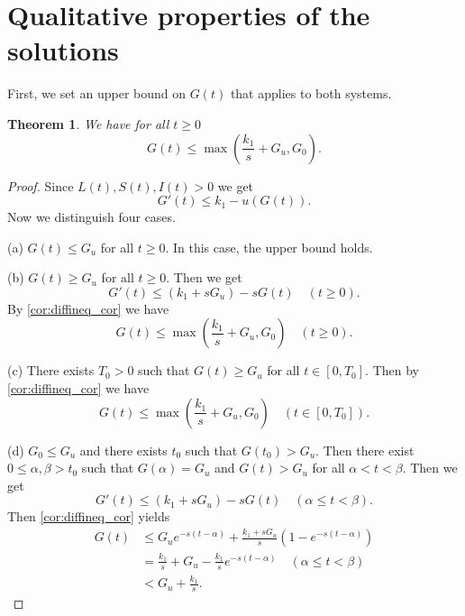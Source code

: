 \documentclass[pdflatex,sn-mathphys-num]{sn-jnl}
\theoremstyle{thmstyleone}
\newtheorem{theorem}{Theorem}[section]
\theoremstyle{thmstyletwo}
\theoremstyle{thmstylethree}
\begin{document}
\section{Qualitative properties of the solutions}\label{sec:qualitative}

First, we set an upper bound on $G(t)$ that applies to both systems.
\begin{theorem}\label{thm:G_upper_est}
    We have for all $t\geq 0$  
\begin{equation*}
    G(t)\leq \max\left(\frac{k_1}{s}+G_u,G_0 \right).
\end{equation*}
\end{theorem}
\begin{proof}
Since $L(t), S(t), I(t)>0$ we get 
\begin{equation*}
    G'(t)\leq k_1-u(G(t)).
\end{equation*}
Now we distinguish four cases.

(a) $G(t)\leq G_u$ for all $t\geq 0$. In this case, the upper bound holds. 

(b) $G(t)\geq G_u$ for all $t\geq 0$. Then we get 
\begin{equation*}
G'(t)\leq (k_1+sG_u)-sG(t)\quad (t\geq 0).
\end{equation*}
By \autoref{cor:diffineq_cor} we have 
\begin{equation*}
G(t)\leq \max \left(\frac{k_1}{s}+G_u,G_0\right) \quad (t\geq 0).
\end{equation*}

(c) There exists $T_0>0$ such that $G(t)\geq G_u$ for all $t\in [0,T_0]$. Then 
by  \autoref{cor:diffineq_cor} we have 
\begin{equation*}
G(t)\leq \max \left(\frac{k_1}{s}+G_u,G_0\right) \quad (t\in [0,T_0]).
\end{equation*}

(d) $G_0\leq G_u$ and there exists $t_0$ such that $G(t_0)>G_u$. Then there exist 
$0\leq\alpha, \beta> t_0$ such that $G(\alpha)=G_u$ and $G(t)>G_u$ for all 
$\alpha <t <\beta$. 
Then we get 
\begin{equation}
G'(t)\leq (k_1+sG_u)-sG(t)\quad (\alpha\leq t<\beta).
\end{equation}
Then \autoref{cor:diffineq_cor} yields 
\begin{align}
G(t) &\leq G_ue^{-s(t-\alpha)}+\frac{k_1+sG_u}{s}
\left(1-e^{-s(t-\alpha)}\right)\\
&=\frac{k_1}{s}+G_u-\frac{k_1}{s}e^{-s(t-\alpha)}\quad (\alpha\leq t<\beta) \nonumber\\
&<G_u+\frac{k_1}{s} \nonumber.
\end{align}
\end{proof}
\end{document}
